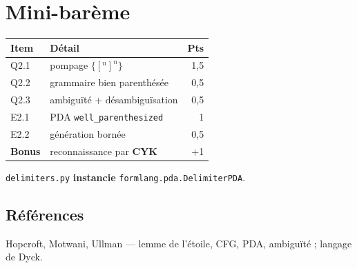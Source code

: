 \documentclass[11pt,a4paper]{scrartcl}
\begin{document}
\section*{Mini-barème}
\begin{center}\small
\begin{tabular}{@{}llr@{}}
\toprule Item & Détail & Pts\\\midrule
Q2.1 & pompage $\{[^{n}]^{n}\}$ & 1,5\\
Q2.2 & grammaire bien parenthésée & 0,5\\
Q2.3 & ambiguïté + désambiguïsation & 0,5\\
E2.1 & PDA \texttt{well\_parenthesized} & 1\\
E2.2 & génération bornée & 0,5\\
\textbf{Bonus} & reconnaissance par \textbf{CYK} & +1\\
\bottomrule
\end{tabular}
\end{center}

\begin{gate}
\texttt{delimiters.py} \textbf{instancie} \texttt{formlang.pda.DelimiterPDA}.
\end{gate}

\subsection*{Références}
Hopcroft, Motwani, Ullman — lemme de l'étoile, CFG, PDA, ambiguïté ; langage de Dyck.
\end{document}

